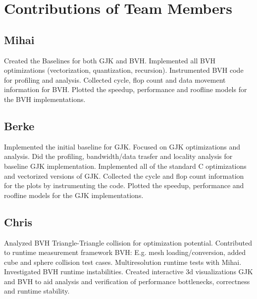 \documentclass[twocolumn]{article}
\begin{document}
\section{Contributions of Team Members}

%
%

\subsection{Mihai} Created the Baselines for both GJK and BVH.
Implemented all BVH optimizations (vectorization, quantization, recursion).
Instrumented BVH code for profiling and analysis.
Collected cycle, flop count and data movement information for BVH.
Plotted the speedup, performance and roofline models for the BVH implementations.

\subsection{Berke} Implemented the initial baseline for GJK.
Focused on GJK optimizations and analysis. Did the profiling, bandwidth/data trasfer and locality analysis for baseline GJK implementation.
Implemented all of the standard C optimizations and vectorized versions of GJK.
Collected the cycle and flop count information for the plots by instrumenting the code.
Plotted the speedup, performance and roofline models for the GJK implementations.

\subsection{Chris}
Analyzed BVH Triangle-Triangle collision for optimization potential.
Contributed to runtime measurement framework BVH:
E.g. mesh loading/conversion, added cube and sphere collision test cases.
Multiresolution runtime tests with Mihai.
Investigated BVH runtime instabilities.
Created interactive 3d visualizations GJK and BVH to aid analysis and verification of performance bottlenecks, correctness and runtime stability.
\end{document}
